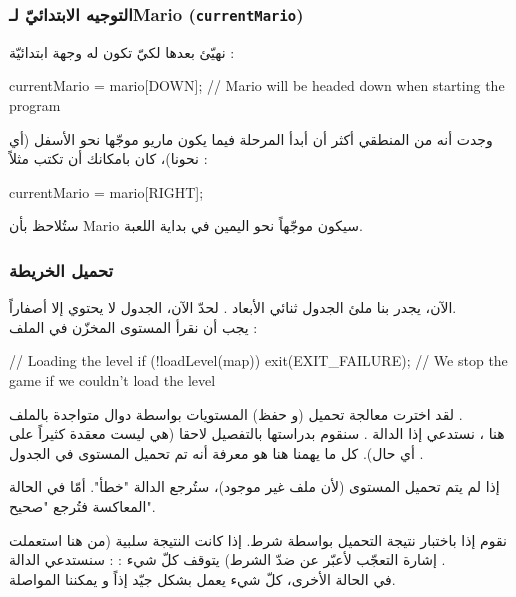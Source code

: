 \subsubsection{التوجيه الابتدائيّ لـ\textenglish{Mario} (\texttt{currentMario})}

نهيّئ بعدها
لكيّ تكون له وجهة ابتدائيّة :
\begin{Csource}
currentMario = mario[DOWN]; // Mario will be headed down when starting the program
\end{Csource}

وجدت أنه من المنطقي أكثر أن أبدأ المرحلة فيما يكون ماريو موجّها نحو الأسفل (أي نحونا)، كان بامكانك أن تكتب مثلاً :

\begin{Csource}
currentMario = mario[RIGHT];
\end{Csource}

ستُلاحظ بأن
\textenglish{Mario}
سيكون موجّهاً نحو اليمين في بداية اللعبة.

\subsubsection{تحميل الخريطة}

الآن، يجدر بنا ملئ الجدول ثنائي الأبعاد
.
لحدّ الآن، الجدول لا يحتوي إلا أصفاراً.\\
يجب أن نقرأ المستوى المخزّن في الملف
 :

\begin{Csource}
// Loading the level
if (!loadLevel(map))
	exit(EXIT_FAILURE); // We stop the game if we couldn't load the level
\end{Csource}

لقد اخترت معالجة تحميل (و حفظ) المستويات بواسطة دوال متواجدة بالملف
.\\
هنا ، نستدعي إذا الدالة
.
سنقوم بدراستها بالتفصيل لاحقا (هي ليست معقدة كثيراً على أي حال). كل ما يهمنا هنا هو معرفة أنه تم تحميل المستوى في الجدول
.

\begin{critical}
إذا لم يتم تحميل المستوى (لأن ملف
غير موجود)، ستُرجع الدالة "خطأ". أمّا في الحالة المعاكسة فتُرجع "صحيح".
\end{critical}

نقوم إذا باختبار نتيجة التحميل بواسطة شرط. إذا كانت النتيجة سلبية (من هنا استعملت إشارة التعجّب لأعبّر عن ضدّ الشرط) يتوقف كلّ شيء : : سنستدعي الدالة 
.\\
في الحالة الأخرى، كلّ شيء يعمل بشكل جيّد إذاً و يمكننا المواصلة.

